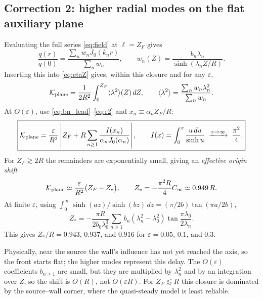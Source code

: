 \documentclass[11pt]{article}
\numberwithin{equation}{section}
\begin{document}
\subsection{Correction 2: higher radial modes on the flat auxiliary plane}
Evaluating the full series \eqref{eq:field} at $\ell=Z_F$ gives
\begin{equation}\frac{q(r)}{q(0)}=\frac{\sum_nw_nJ_0(k_nr)}{\sum_nw_n},\qquad w_n(Z)=\frac{b_n\lambda_n}{\sinh(\lambda_nZ/R)}.\end{equation}
Inserting this into \eqref{eq:etaZ} gives, within this closure and for any $\varepsilon$,
\begin{equation}\mathcal K_{\rm plane}=\frac{1}{2R^2}\int_0^{Z_F}\langle\lambda^2\rangle(Z)\,dZ,\qquad
\langle\lambda^2\rangle=\frac{\sum_nw_n\lambda_n^2}{\sum_nw_n}.\label{eq:Kplane_exact}\end{equation}
At $O(\varepsilon)$, use \eqref{eq:bn_lead}--\eqref{eq:r2} and $x_n\equiv\alpha_nZ_F/R$:
\begin{equation}\boxed{\mathcal K_{\rm plane}=\frac{\varepsilon}{R^2}\left|Z_F+R\sum_{n\ge1}\frac{I(x_n)}{\alpha_nJ_0(\alpha_n)}\right|,\qquad I(x)=\int_0^x\frac{u\,du}{\sinh u}\;\xrightarrow{x\to\infty}\;\frac{\pi^2}{4}.}\label{eq:Kplane}\end{equation}
For $Z_F\gtrsim2R$ the remainders are exponentially small, giving an \emph{effective origin shift}
\begin{equation}\mathcal K_{\rm plane}\simeq\frac{\varepsilon}{R^2}\bigl(Z_F-Z_*\bigr),\qquad Z_*=-\frac{\pi^2R}{4}C_\infty\simeq0.949\,R.\end{equation}
At finite $\varepsilon$, using $\int_0^\infty\sinh(az)/\sinh(bz)\,dz=(\pi/2b)\tan(\pi a/2b)$,
\begin{equation}Z_*=-\frac{\pi R}{2b_0\lambda_0^3}\sum_{n\ge1}b_n(\lambda_n^2-\lambda_0^2)\tan\frac{\pi\lambda_0}{2\lambda_n}.\end{equation}
This gives $Z_*/R=0.943$, $0.937$, and $0.916$ for $\varepsilon=0.05$, $0.1$, and $0.3$.

Physically, near the source the wall's influence has not yet reached the axis, so the front starts flat; the higher modes represent this delay. The $O(\varepsilon)$ coefficients $b_{n\ge1}$ are small, but they are multiplied by $\lambda_n^2$ and by an integration over $Z$, so the shift is $O(R)$, not $O(\varepsilon R)$. For $Z_F\lesssim R$ this closure is dominated by the source--wall corner, where the quasi-steady model is least reliable.
\end{document}
